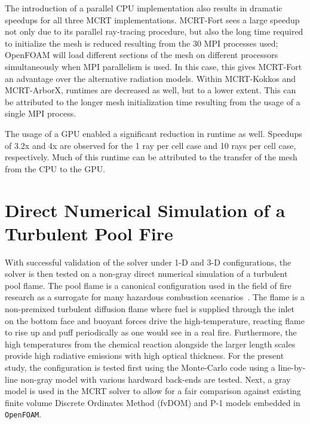 The introduction of a parallel CPU implementation also results in dramatic speedups for all three MCRT implementations. MCRT-Fort sees a large speedup not only due to its parallel ray-tracing procedure, but also the long time required to initialize the mesh is reduced resulting from the 30 MPI processes used; OpenFOAM will load different sections of the mesh on different processors simultaneously when MPI parallelism is used. In this case, this gives MCRT-Fort an advantage over the alternative radiation models.
Within MCRT-Kokkos and MCRT-ArborX, runtimes are decreased as well, but to a lower extent. This can be attributed to the longer mesh initialization time resulting from the usage of a single MPI process.

The usage of a GPU enabled a significant reduction in runtime as well. Speedups of 3.2x and 4x are observed for the 1 ray per cell case and 10 rays per cell case, respectively.
Much of this runtime can be attributed to the transfer of the mesh from the CPU to the GPU.

\section{Direct Numerical Simulation of a Turbulent Pool Fire}\label{section:DNSPoolFire}
With successful validation of the solver under 1-D and 3-D configurations, the solver is then tested on a non-gray direct numerical simulation of a turbulent pool flame. The pool flame is a canonical configuration used in the field of fire research as a surrogate for many hazardous combustion scenarios~\cite{Chen2023PoolAdvances}. 
The flame is a non-premixed turbulent diffusion flame where fuel is supplied through the inlet on the bottom face and buoyant forces drive the high-temperature, reacting flame to rise up and puff periodically as one would see in a real fire.
Furthermore, the high temperatures from the chemical reaction alongside the larger length scales provide high radiative emissions with high optical thickness. For the present study, the configuration is tested first using the Monte-Carlo code using a line-by-line non-gray model with various hardward back-ends are tested. Next, a gray model is used in the MCRT solver to allow for a fair comparison against existing finite volume Discrete Ordinates Method (fvDOM) and P-1 models embedded in \texttt{OpenFOAM}.

